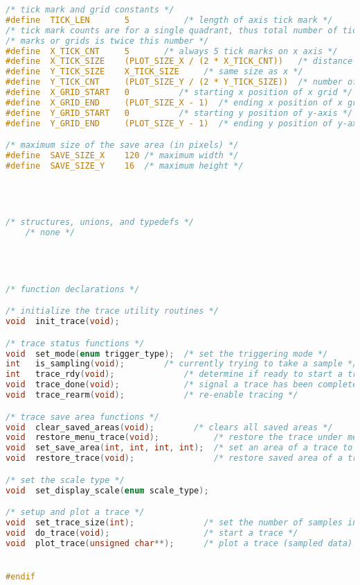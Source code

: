 \begin{lstlisting}[language=C]
/* tick mark and grid constants */
#define  TICK_LEN       5    		/* length of axis tick mark */
/* tick mark counts are for a single quadrant, thus total number of tick */
/* marks or grids is twice this number */
#define  X_TICK_CNT     5		/* always 5 tick marks on x axis */
#define  X_TICK_SIZE    (PLOT_SIZE_X / (2 * X_TICK_CNT))   /* distance between tick marks */
#define  Y_TICK_SIZE    X_TICK_SIZE     /* same size as x */
#define  Y_TICK_CNT     (PLOT_SIZE_Y / (2 * Y_TICK_SIZE))  /* number of y tick marks */
#define  X_GRID_START   0		   /* starting x position of x grid */
#define  X_GRID_END     (PLOT_SIZE_X - 1)  /* ending x position of x grid */
#define  Y_GRID_START   0		   /* starting y position of y-axis */
#define  Y_GRID_END     (PLOT_SIZE_Y - 1)  /* ending y position of y-axis */

/* maximum size of the save area (in pixels) */
#define  SAVE_SIZE_X	120	/* maximum width */
#define  SAVE_SIZE_Y	16	/* maximum height */




/* structures, unions, and typedefs */
    /* none */




/* function declarations */

/* initialize the trace utility routines */
void  init_trace(void);

/* trace status functions */
void  set_mode(enum trigger_type);  /* set the triggering mode */
int   is_sampling(void);	    /* currently trying to take a sample */
int   trace_rdy(void);              /* determine if ready to start a trace */
void  trace_done(void);             /* signal a trace has been completed */
void  trace_rearm(void);            /* re-enable tracing */

/* trace save area functions */
void  clear_saved_areas(void);		  /* clears all saved areas */
void  restore_menu_trace(void);           /* restore the trace under menus */
void  set_save_area(int, int, int, int);  /* set an area of a trace to save */
void  restore_trace(void);                /* restore saved area of a trace */

/* set the scale type */
void  set_display_scale(enum scale_type);

/* setup and plot a trace */
void  set_trace_size(int);              /* set the number of samples in a trace */
void  do_trace(void);                   /* start a trace */
void  plot_trace(unsigned char**);      /* plot a trace (sampled data) */


#endif
\end{lstlisting}

